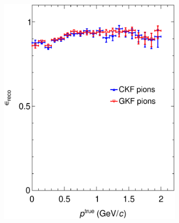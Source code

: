 \begin{figure}[t]
\begin{subfigure}{0.32\textwidth}
         \includegraphics[width=\textwidth]{figures/ch5-KF_NDGAr/FullSample/Integration/EffVSp211.eps}
         \caption{}
         \label{fig:Eff211_Integration}
     \end{subfigure}
    \begin{subfigure}{0.32\textwidth}
         \centering

\end{subfigure}
\end{figure}
